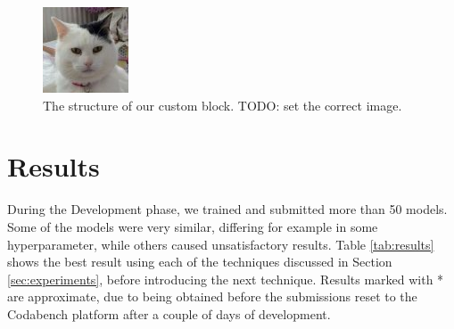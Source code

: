 \documentclass[11pt]{article}
\begin{document}
\begin{multicols}{2}
      \begin{figure}[H]
            \centering
            \includegraphics[width=0.75\linewidth]{custom_block.jpg}
            \caption{The structure of our custom block. TODO: set the correct image.}
            \label{fig:custom_block}
      \end{figure}

      \label{sec:results}
      \section{Results}

      During the Development phase, we trained and submitted more than 50 models. Some of the models were very similar, differing for example in some hyperparameter, while others caused unsatisfactory results. Table \ref{tab:results} shows the best result using each of the techniques discussed in Section \ref{sec:experiments}, before introducing the next technique. Results marked with * are approximate, due to being obtained before the submissions reset to the Codabench platform after a couple of days of development.


\end{multicols}
\end{document}
